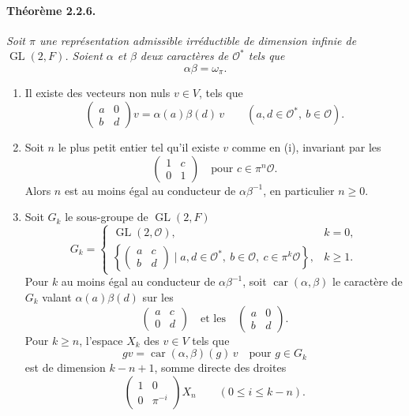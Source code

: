 \documentclass[10pt,a4paper]{article}
\providecommand{\GL}{\operatorname{GL}}
\providecommand{\car}{\operatorname{car}}
\providecommand{\OO}{\mathcal O}
\begin{document}
\paragraph{Théorème 2.2.6.}{\itshape  Soit \(\pi\) une représentation admissible irréductible de dimension infinie de \(\GL(2,F)\). Soient \(\alpha\) et \(\beta\) deux caractères de \(\OO^*\) tels que
\[
\alpha\beta=\omega_\pi.
\]
\begin{enumerate}[label=(\roman*)]
\item Il existe des vecteurs non nuls \(v\in V\), tels que
\[
\begin{pmatrix}a&0\\b&d\end{pmatrix}v=\alpha(a)\beta(d)\,v
\qquad(a,d\in\OO^*,\ b\in\OO).
\]
\item Soit \(n\) le plus petit entier tel qu'il existe \(v\) comme en (i), invariant par les
\[
\begin{pmatrix}1&c\\0&1\end{pmatrix}
\quad\text{pour }c\in\pi^n\OO.
\]
Alors \(n\) est au moins égal au conducteur de \(\alpha\beta^{-1}\), en particulier \(n\ge0\).
\item Soit \(G_k\) le sous-groupe de \(\GL(2,F)\)
\[
G_k=
\begin{cases}
\GL(2,\OO),&k=0,\\[0.4em]
\left\{\begin{pmatrix}a&c\\b&d\end{pmatrix}\mid
a,d\in\OO^*,\ b\in\OO,\ c\in\pi^k\OO\right\},&k\ge1.
\end{cases}
\]
Pour \(k\) au moins égal au conducteur de \(\alpha\beta^{-1}\), soit \(\car(\alpha,\beta)\) le caractère de \(G_k\) valant \(\alpha(a)\beta(d)\) sur les
\[
\begin{pmatrix}a&c\\0&d\end{pmatrix}
\quad\text{et les}\quad
\begin{pmatrix}a&0\\b&d\end{pmatrix}.
\]
Pour \(k\ge n\), l'espace \(X_k\) des \(v\in V\) tels que
\[
gv=\car(\alpha,\beta)(g)\,v\quad\text{pour }g\in G_k
\]
est de dimension \(k-n+1\), somme directe des droites
\[
\begin{pmatrix}1&0\\0&\pi^{-i}\end{pmatrix}X_n
\qquad(0\le i\le k-n).
\]
\end{enumerate}\par}
\end{document}
